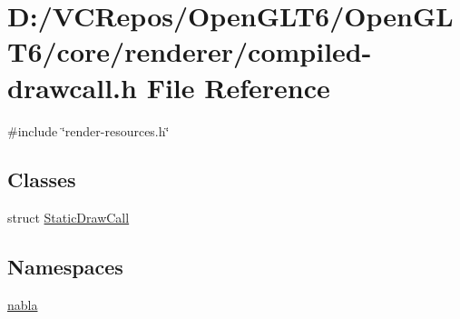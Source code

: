 \hypertarget{compiled-drawcall_8h}{}\section{D\+:/\+V\+C\+Repos/\+Open\+G\+L\+T6/\+Open\+G\+L\+T6/core/renderer/compiled-\/drawcall.h File Reference}
\label{compiled-drawcall_8h}
{\ttfamily \#include \char`\"{}render-\/resources.\+h\char`\"{}}\newline
\subsection*{Classes}
\begin{DoxyCompactItemize}
\item 
struct \mbox{\hyperlink{struct_static_draw_call}{Static\+Draw\+Call}}
\end{DoxyCompactItemize}
\subsection*{Namespaces}
\begin{DoxyCompactItemize}
\item 
 \mbox{\hyperlink{namespacenabla}{nabla}}
\end{DoxyCompactItemize}
